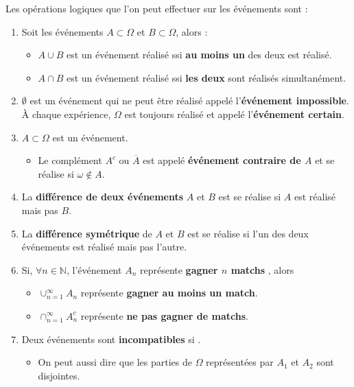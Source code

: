 \documentclass[10pt, french]{report}
\begin{document}
\begin{multicols*}{2}
\begin{definitionNOHFILLprop}
Les opérations logiques que l'on peut effectuer sur les événements sont : 
\begin{enumerate}
	\item	Soit les événements $A \subset \Omega$ et $B \subset \Omega$, alors : 
		\begin{itemize}
		\item	$A \cup B$ est un événement réalisé ssi \textbf{au moins un} des deux est réalisé.
		\item	$A \cap B$ est un événement réalisé ssi \textbf{les deux} sont réalisés simultanément.
		\end{itemize}
	\item	$\emptyset$ est un événement qui ne peut être réalisé appelé l'\textbf{événement impossible}. À chaque expérience, $\Omega$ est toujours réalisé et appelé l'\textbf{événement certain}.
	\item	$A \subset \Omega$ est un événement.
		\begin{itemize}
		\item	Le complément $A^{c}$ ou $\overline{A}$ est appelé \textbf{événement contraire de $A$} et se réalise si $\omega \notin A$.
		\end{itemize}
	\item	La \textbf{différence de deux événements} $A$ et $B$ est  se réalise si $A$ est réalisé mais pas $B$.
	\item	La \textbf{différence symétrique} de $A$ et $B$ est  se réalise si l'un des deux événements est réalisé mais pas l'autre.
	\item	Si, $\forall n \in \mathbb{N}$, l'événement $A_{n}$ représente \og \textbf{gagner $n$ matchs} \fg{}, alors 
		\begin{itemize}
		\item	$\displaystyle \cup_{n = 1}^{\infty} A_{n}$ représente \og \textbf{gagner au moins un match}\fg{}.
		\item	$\displaystyle \cap_{n = 1}^{\infty} A_{n}^{c}$ représente \og \textbf{ne pas gagner de matchs}\fg{}.
		\end{itemize}
	\item	Deux événements sont \textbf{incompatibles} si . 
		\begin{itemize}
		\item	On peut aussi dire que les parties de $\Omega$ représentées par $A_{1}$ et $A_{2}$ sont disjointes.

\end{itemize}
\end{enumerate}
\end{definitionNOHFILLprop}
\end{multicols*}
\end{document}
